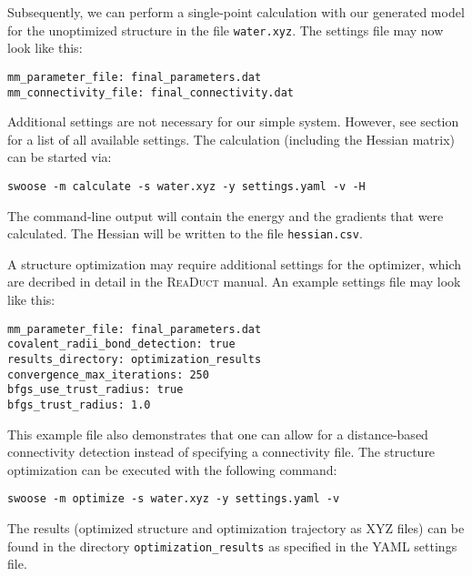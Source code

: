 \documentclass[]{tufte-book}
\begin{document}
{{Subsequently, we can perform a single-point calculation with our generated model for the unoptimized structure in the file \texttt{water.xyz}. The settings file may now look like this:
\begin{mdframed}[backgroundcolor=LightSteelBlue!25, linewidth=0pt]
\begin{verbatim}
mm_parameter_file: final_parameters.dat
mm_connectivity_file: final_connectivity.dat
\end{verbatim}
\end{mdframed}
Additional settings are not necessary for our simple system. However, see section  for a list of all available settings. The calculation (including the Hessian matrix) can be started via:
\begin{mdframed}[backgroundcolor=LightSteelBlue!25, linewidth=0pt]
\begin{verbatim}
swoose -m calculate -s water.xyz -y settings.yaml -v -H
\end{verbatim}
\end{mdframed}
The command-line output will contain the energy and the gradients that were calculated. The Hessian will be written to the file \texttt{hessian.csv}.

A structure optimization may require additional settings for the optimizer, which are decribed in detail in the \textsc{ReaDuct} manual. An example settings file may look like this:
\begin{mdframed}[backgroundcolor=LightSteelBlue!25, linewidth=0pt]
\begin{verbatim}
mm_parameter_file: final_parameters.dat
covalent_radii_bond_detection: true
results_directory: optimization_results
convergence_max_iterations: 250
bfgs_use_trust_radius: true
bfgs_trust_radius: 1.0
\end{verbatim}
\end{mdframed}
This example file also demonstrates that one can allow for a distance-based connectivity detection instead of specifying a connectivity file.
The structure optimization can be executed with the following command:
\begin{mdframed}[backgroundcolor=LightSteelBlue!25, linewidth=0pt]
\begin{verbatim}
swoose -m optimize -s water.xyz -y settings.yaml -v
\end{verbatim}
\end{mdframed}
The results (optimized structure and optimization trajectory as XYZ files) can be found in the directory \texttt{optimization\_results} as specified in the YAML settings file.

}}
\end{document}
